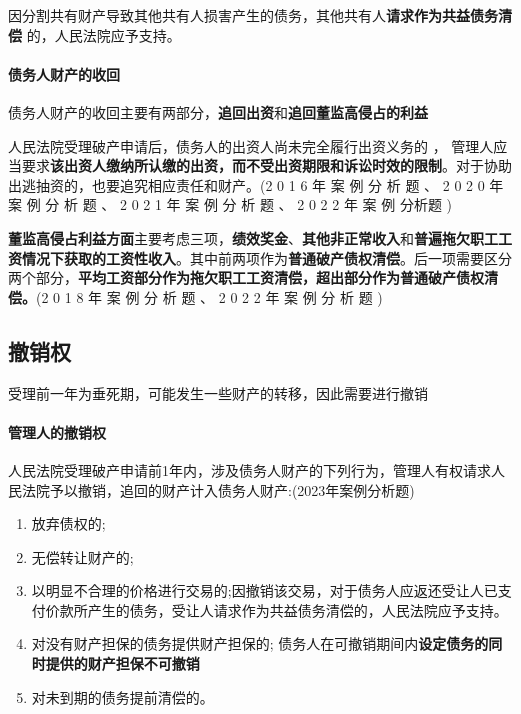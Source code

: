 \documentclass[UTF8,12pt]{ctexart}
\numberwithin{equation}{section} %
\numberwithin{figure}{section}
\numberwithin{table}{section}
\begin{document}
	因分割共有财产导致其他共有人损害产生的债务，其他共有人\textbf{请求作为共益债务清偿} 的，人民法院应予支持。
	
	\paragraph{债务人财产的收回}
	债务人财产的收回主要有两部分，\textbf{追回出资}和\textbf{追回董监高侵占的利益}
	
	人民法院受理破产申请后，债务人的出资人尚未完全履行出资义务的 ， 管理人应当要求\textbf{该出资人缴纳所认缴的出资，而不受出资期限和诉讼时效的限制}。对于协助出逃抽资的，也要追究相应责任和财产。(2 0 1 6 年 案 例 分 析 题 、 2 0 2 0 年 案 例 分 析 题 、 2 0 2 1 年 案 例 分 析 题 、 2 0 2 2 年 案 例 分析题 )
	
	\textbf{董监高侵占利益方面}主要考虑三项，\textbf{绩效奖金}、\textbf{其他非正常收入}和\textbf{普遍拖欠职工工资情况下获取的工资性收入}。其中前两项作为\textbf{普通破产债权清偿}。后一项需要区分两个部分，\textbf{平均工资部分作为拖欠职工工资清偿，超出部分作为普通破产债权清偿。}(2 0 1 8 年 案 例 分 析 题 、 2 0 2 2 年 案 例 分 析 题 ) 
	
	\subsection{撤销权}
	受理前一年为垂死期，可能发生一些财产的转移，因此需要进行撤销
	
	\paragraph{管理人的撤销权}
	人民法院受理破产申请前1年内，涉及债务人财产的下列行为，管理人有权请求人民法院予以撤销，追回的财产计入债务人财产:(2023年案例分析题)
	\begin{enumerate}
		\item 放弃债权的;
		
		\item 无偿转让财产的;
		
		\item 以明显不合理的价格进行交易的;因撤销该交易，对于债务人应返还受让人已支 付价款所产生的债务，受让人请求作为共益债务清偿的，人民法院应予支持。
		
		\item 对没有财产担保的债务提供财产担保的; 债务人在可撤销期间内\textbf{设定债务的同时提供的财产担保不可撤销}
		
		\item 对未到期的债务提前清偿的。
	\end{enumerate}
	
\end{document}
